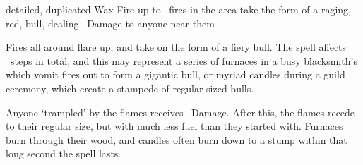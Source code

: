   {detailed, duplicated}%
  {Wax}%
  {Fire}%
  {}%
  {up to \spellArea\ fires in the area take the form of a raging, red, bull, dealing \showDam\ Damage to anyone near them}%
  {
    Fires all around flare up, and take on the form of a fiery bull.
    The spell affects \spellArea\ steps in total, and this may represent a series of furnaces in a busy blacksmith's which vomit fires out to form a gigantic bull, or myriad candles during a guild ceremony, which create a stampede of regular-sized bulls.

  Anyone `trampled' by the flames receives \showDam\ Damage.
  After this, the flames recede to their regular size, but with much less fuel than they started with.
  Furnaces burn through their wood, and candles often burn down to a stump within that long second the spell lasts.
  }

